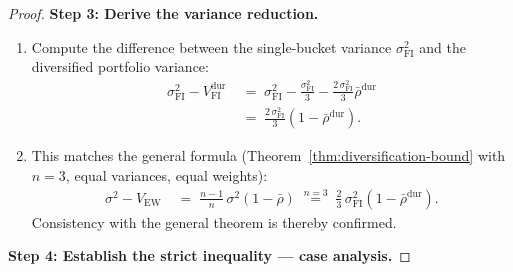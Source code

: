 \documentclass[12pt,openany]{book}
\numberwithin{equation}{chapter}
\theoremstyle{plain}
\theoremstyle{definition}
\theoremstyle{remark}
\begin{document}
\begin{proof}
\medskip
\noindent\textbf{Step 3: Derive the variance reduction.}

\begin{enumerate}
  \item Compute the difference between the single-bucket variance
        $\sigma_{\mathrm{FI}}^2$ and the diversified
        portfolio variance:
        \begin{align}
          \sigma_{\mathrm{FI}}^2
          - V_{\mathrm{FI}}^{\mathrm{dur}}
          &\;=\; \sigma_{\mathrm{FI}}^2
                 - \frac{\sigma_{\mathrm{FI}}^2}{3}
                 - \frac{2\,\sigma_{\mathrm{FI}}^2}{3}
                   \bar{\rho}^{\mathrm{dur}}
          \nonumber\\
          &\;=\; \frac{2\,\sigma_{\mathrm{FI}}^2}{3}
                 \!\left(1 - \bar{\rho}^{\mathrm{dur}}\right).
          \label{eq:dur-reduction}
        \end{align}
  \item This matches the general formula
        (Theorem~\ref{thm:diversification-bound} with $n = 3$,
        equal variances, equal weights):
        \begin{align}
          \sigma^2 - V_{\mathrm{EW}}
          &\;=\; \frac{n-1}{n}\,\sigma^2
                 (1 - \bar{\rho})
          \;\stackrel{n=3}{=}\;
          \frac{2}{3}\,\sigma_{\mathrm{FI}}^2
          (1 - \bar{\rho}^{\mathrm{dur}}).
        \end{align}
        Consistency with the general theorem is thereby confirmed.
\end{enumerate}

\medskip
\noindent\textbf{Step 4: Establish the strict inequality ---
case analysis.}


\end{proof}
\end{document}
